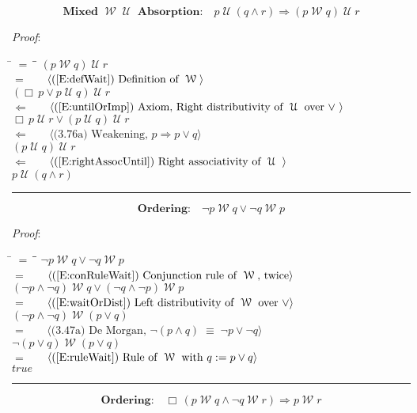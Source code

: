 \documentclass[12pt, fleqn, leqno]{article}
\newcommand{\lgap}{2pt}                             %
\newcommand{\mymathindent}{24pt}                    %
\newcommand{\equivs}{\ensuremath{\;\equiv\;}}       %
\newcommand{\impl}{\ensuremath{\Rightarrow}}        %
\newcommand{\foll}{\ensuremath{\Leftarrow}}         %
\newcommand{\Until}{\;\mathcal{U}\;}
\newcommand{\Wait}{\;\mathcal{W}\;}
\newcommand{\Always}{\Box\,}
\newcommand{\myqed}{\rule[-.23ex]{1.2ex}{2.0ex}}
\newcommand{\myqedtab}{\hspace{384pt}}              %
\newcommand{\Gll} {\langle}                         %
\newcommand{\Ggg} {\rangle}                         %
\newcommand{\Hint}[1]     {\ \ \ $\Gll              \mbox{#1} \Ggg$ }   %
\begin{document}
\begin{equation}\label{E:mix7untilImpAbsR}
\textbf{Mixed $\Wait\Until$ Absorption:}\quad p \Until (q \land r) \impl (p \Wait q) \Until r
\end{equation}

\emph{Proof}:
\begin{tabbing}
\hspace{\mymathindent} \= $= \;$ \= \myqedtab \= \kill
\> \>   $(p \Wait q) \Until r$\\[\lgap]
\> $=$ \> \Hint{(\ref{E:defWait}) Definition of $\Wait$} \\[\lgap]
\> \>   $(\Always p \lor p \Until q) \Until r$\\[\lgap]
\> $\foll$ \> \Hint{(\ref{E:untilOrImp}) Axiom, Right distributivity of $\Until$ over $\lor$ } \\[\lgap]
\> \>   $\Always p \Until r \lor (p \Until q) \Until r$\\[\lgap]
\> $\foll$ \> \Hint{(3.76a) Weakening, $p\impl p\lor q$} \\[\lgap]
\> \>   $(p\Until q)\Until r$\\[\lgap]
\> $\foll$ \> \Hint{(\ref{E:rightAssocUntil}) Right associativity of $\Until$ } \\[\lgap]
\> \>   $p \Until (q \land r)$ \quad \myqed
\end{tabbing}

\begin{equation}\label{E:waitOrdering}
\textbf{Ordering:}\quad \neg p \Wait q \lor \neg q \Wait p
\end{equation}

\emph{Proof}:
\begin{tabbing}
\hspace{\mymathindent} \= $= \;$ \= \myqedtab \= \kill
  \> \>   $\neg p \Wait q \lor \neg q \Wait p$\\[\lgap]
  \> $=$ \> \Hint{(\ref{E:conRuleWait}) Conjunction rule of $\Wait$, twice}\\[\lgap]
  \> \>   $(\neg p\land \neg q) \Wait q \lor (\neg q \land \neg p)\Wait p$\\[\lgap]
  \> $=$  \>  \Hint{(\ref{E:waitOrDist}) Left distributivity of $\Wait$ over $\lor$}\\[\lgap]
  \> \>   $(\neg p\land \neg q) \Wait (p\lor q)$\\[\lgap]
  \> $=$  \>  \Hint{(3.47a) De Morgan, $\neg(p\land q)\equivs \neg p\lor\neg q$}\\[\lgap]
  \> \>   $\neg (p\lor q)\Wait (p\lor q)$\\[\lgap]
  \> $=$  \>  \Hint{(\ref{E:ruleWait}) Rule of $\Wait$ with $q := p\lor q$}\\[\lgap]
  \> \>   $true$ \quad \myqed
\end{tabbing}
\begin{equation}\label{E:waitOrderingTwo}
\textbf{Ordering:}\quad \Always (p \Wait q \land \neg q \Wait r) \impl p \Wait r
\end{equation}
\end{document}
